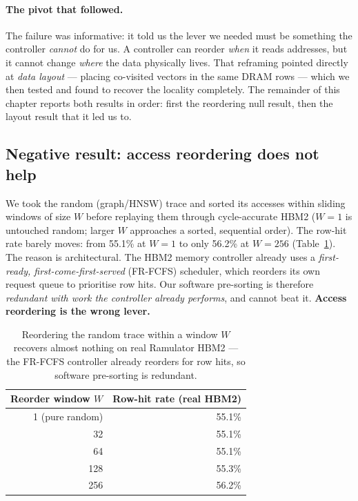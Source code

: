\documentclass[11pt,a4paper]{article}
\begin{document}
\paragraph{The pivot that followed.} The failure was informative: it told us the lever we needed must
be something the controller \emph{cannot} do for us. A controller can reorder \emph{when} it reads
addresses, but it cannot change \emph{where} the data physically lives. That reframing pointed
directly at \emph{data layout} --- placing co-visited vectors in the same DRAM rows --- which we then
tested and found to recover the locality completely. The remainder of this chapter reports both
results in order: first the reordering null result, then the layout result that it led us to.

\subsection{Negative result: access reordering does not help}

We took the random (graph/HNSW) trace and sorted its accesses within sliding windows of size $W$
before replaying them through cycle-accurate HBM2 ($W{=}1$ is untouched random; larger $W$ approaches
a sorted, sequential order). The row-hit rate barely moves: from 55.1\% at $W{=}1$ to only 56.2\% at
$W{=}256$ (Table~\ref{tab:opt}). The reason is architectural. The HBM2 memory controller already uses
a \emph{first-ready, first-come-first-served} (FR-FCFS) scheduler, which reorders its own request
queue to prioritise row hits. Our software pre-sorting is therefore \emph{redundant with work the
controller already performs}, and cannot beat it. \textbf{Access reordering is the wrong lever.}

\begin{table}[h]
\centering
\renewcommand{\arraystretch}{1.2}
\begin{tabular}{rr}
\toprule
\textbf{Reorder window $W$} & \textbf{Row-hit rate (real HBM2)} \\
\midrule
1 \; (pure random)      & 55.1\% \\
32                      & 55.1\% \\
64                      & 55.1\% \\
128                     & 55.3\% \\
256                     & 56.2\% \\
\bottomrule
\end{tabular}
\caption{Reordering the random trace within a window $W$ recovers almost nothing on real Ramulator
HBM2 --- the FR-FCFS controller already reorders for row hits, so software pre-sorting is redundant.}
\label{tab:opt}
\end{table}
\end{document}
